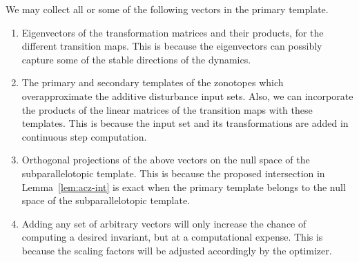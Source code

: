   We may collect all or some of
the following vectors in the primary template.
%
\begin{enumerate}
\item Eigenvectors of the transformation matrices and their products, for the
   different transition maps.  This is because the eigenvectors can
  possibly capture some of the stable directions of the dynamics.
\item The primary and secondary templates of the zonotopes which overapproximate the additive disturbance input sets.
  Also, we can incorporate the products of the linear matrices of the
  transition maps with these templates. This is because the input set and
  its transformations are added in continuous step computation.
\item Orthogonal projections of the above vectors on the null
  space of the subparallelotopic template.  This is because the
  proposed intersection in Lemma~\ref{lem:acz-int} is exact when the
  primary template belongs to the null space of the subparallelotopic
  template.
\item Adding any set of arbitrary vectors will only increase the chance of computing a desired
  invariant, but at a computational expense.  This is because the
  scaling factors will be adjusted accordingly by the optimizer. 
\end{enumerate}
